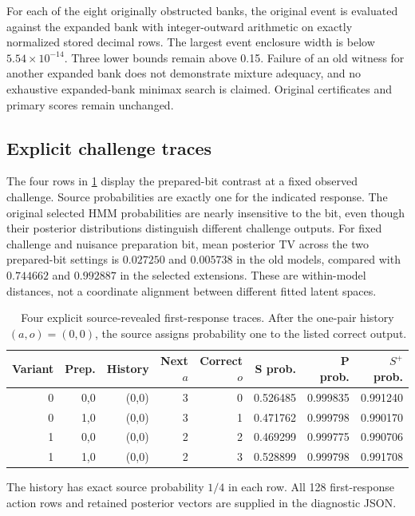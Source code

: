 For each of the eight originally obstructed banks, the original event is evaluated against the expanded bank with integer-outward arithmetic on exactly normalized stored decimal rows. The largest event enclosure width is below $5.54\times10^{-14}$. Three lower bounds remain above 0.15. Failure of an old witness for another expanded bank does not demonstrate mixture adequacy, and no exhaustive expanded-bank minimax search is claimed. Original certificates and primary scores remain unchanged.

\subsection{Explicit challenge traces}
The four rows in \cref{tab:challenge-traces} display the prepared-bit contrast at a fixed observed challenge. Source probabilities are exactly one for the indicated response. The original selected HMM probabilities are nearly insensitive to the bit, even though their posterior distributions distinguish different challenge outputs. For fixed challenge and nuisance preparation bit, mean posterior TV across the two prepared-bit settings is $0.027250$ and $0.005738$ in the old models, compared with $0.744662$ and $0.992887$ in the selected extensions. These are within-model distances, not a coordinate alignment between different fitted latent spaces.


\begin{table}[tbp]
\centering\caption{Four explicit source-revealed first-response traces. After the one-pair history $(a,o)=(0,0)$, the source assigns probability one to the listed correct output.}\label{tab:challenge-traces}
\small\begin{tabular}{@{}rrrrrrrr@{}}\toprule
Variant & Prep. & History & Next $a$ & Correct $o$ & S prob. & P prob. & $S^+$ prob.\\\midrule
0 & 0,0 & (0,0) & 3 & 0 & 0.526485 & 0.999835 & 0.991240\\
0 & 1,0 & (0,0) & 3 & 1 & 0.471762 & 0.999798 & 0.990170\\
1 & 0,0 & (0,0) & 2 & 2 & 0.469299 & 0.999775 & 0.990706\\
1 & 1,0 & (0,0) & 2 & 3 & 0.528899 & 0.999798 & 0.991708\\\bottomrule
\end{tabular}
\par\smallskip\footnotesize The history has exact source probability $1/4$ in each row. All 128 first-response action rows and retained posterior vectors are supplied in the diagnostic JSON.
\end{table}

